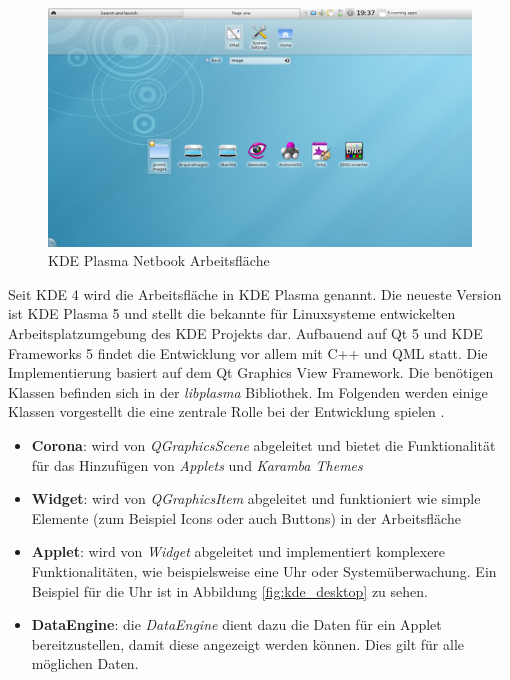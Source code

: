 \documentclass[10pt,a4paper,twocolumn]{article}
\begin{document}
\begin{figure}[h]
	\centering
	\includegraphics[width=0.9\columnwidth]{images/netbook.png}
	\caption{KDE Plasma Netbook Arbeitsfläche \cite{KDEWorkspaces}}
	\label{fig:kde_netbook}
\end{figure}


Seit KDE 4 wird die Arbeitsfläche in KDE Plasma genannt. Die neueste Version ist KDE Plasma 5 und stellt die bekannte für Linuxsysteme entwickelten Arbeitsplatzumgebung des KDE Projekts dar. Aufbauend auf Qt 5 und KDE Frameworks 5 findet die Entwicklung vor allem mit C++ und QML statt. Die Implementierung basiert auf dem Qt Graphics View Framework. Die benötigen Klassen befinden sich in der \textit{libplasma} Bibliothek. Im Folgenden werden einige Klassen vorgestellt die eine zentrale Rolle bei der Entwicklung spielen \cite{KDEPlasma}.

\begin{itemize}
	\item \textbf{Corona}: wird von \textit{QGraphicsScene} abgeleitet und bietet die Funktionalität für das Hinzufügen von \textit{Applets} und \textit{Karamba Themes}
	\item \textbf{Widget}: wird von \textit{QGraphicsItem} abgeleitet und funktioniert wie simple Elemente (zum Beispiel Icons oder auch Buttons) in der Arbeitsfläche
	\item \textbf{Applet}: wird von \textit{Widget} abgeleitet und implementiert komplexere Funktionalitäten, wie beispielsweise eine Uhr oder Systemüberwachung. Ein Beispiel für die Uhr ist in Abbildung \ref{fig:kde_desktop} zu sehen.
	\item \textbf{DataEngine}: die \textit{DataEngine} dient dazu die Daten für ein Applet bereitzustellen, damit diese angezeigt werden können. Dies gilt für alle möglichen Daten.
\end{itemize}
\end{document}
